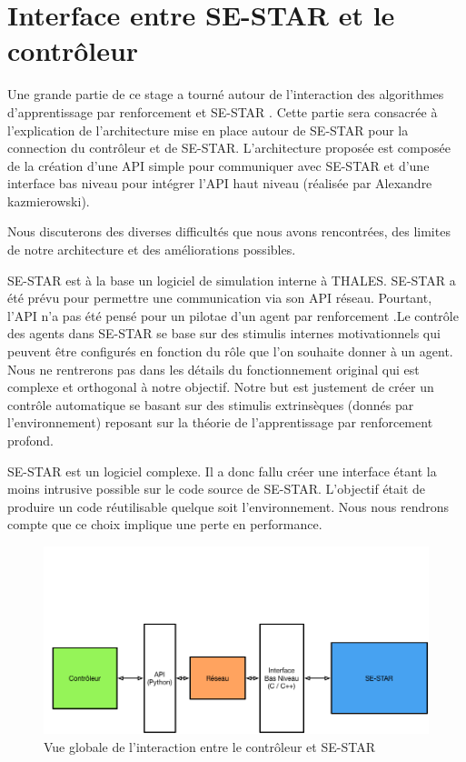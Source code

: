 
\section{Interface entre SE-STAR et le contrôleur}

Une grande partie de ce stage a tourné autour de l'interaction des algorithmes d'apprentissage par renforcement et SE-STAR . Cette partie sera consacrée à l'explication de l'architecture mise en place autour de SE-STAR pour la connection du contrôleur et de SE-STAR.
L'architecture proposée est composée de la création d'une \gls{API} simple pour communiquer avec SE-STAR et d'une interface bas niveau pour intégrer l'\gls{API} haut niveau (réalisée par Alexandre  kazmierowski).

Nous discuterons des diverses difficultés que nous avons rencontrées, des limites de notre architecture et des améliorations possibles.


SE-STAR est à la base un logiciel de simulation interne à THALES. SE-STAR a été prévu pour permettre une communication via son \gls{API} réseau. Pourtant, l'API n'a pas été pensé pour un pilotae d'un agent par renforcement .Le contrôle des agents dans SE-STAR se base sur des stimulis internes motivationnels qui peuvent être configurés en fonction du rôle que l'on souhaite donner à un agent. Nous ne rentrerons pas dans les détails du fonctionnement original qui est complexe et orthogonal à notre objectif. Notre but est justement de créer un contrôle automatique se basant sur des stimulis extrinsèques (donnés par l'environnement) reposant sur la théorie de l'apprentissage par renforcement profond.

SE-STAR est un logiciel complexe. Il a donc fallu créer une interface étant la moins intrusive possible sur le code source de SE-STAR. L'objectif était de produire un code réutilisable quelque soit l'environnement. Nous nous rendrons compte que ce choix implique une perte en performance.

\begin{figure}[!h]
\centering
\includegraphics[width=.9\linewidth]{./assets/interfaceReseau/overviewInterface}
\caption{Vue globale de l'interaction entre le contrôleur et SE-STAR}
\end{figure}

